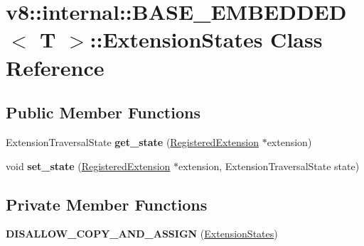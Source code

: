 \hypertarget{classv8_1_1internal_1_1_b_a_s_e___e_m_b_e_d_d_e_d_1_1_extension_states}{}\section{v8\+:\+:internal\+:\+:B\+A\+S\+E\+\_\+\+E\+M\+B\+E\+D\+D\+ED$<$ T $>$\+:\+:Extension\+States Class Reference}
\label{classv8_1_1internal_1_1_b_a_s_e___e_m_b_e_d_d_e_d_1_1_extension_states}
\subsection*{Public Member Functions}
\begin{DoxyCompactItemize}
\item 
Extension\+Traversal\+State {\bfseries get\+\_\+state} (\hyperlink{classv8_1_1_registered_extension}{Registered\+Extension} $\ast$extension)\hypertarget{classv8_1_1internal_1_1_b_a_s_e___e_m_b_e_d_d_e_d_1_1_extension_states_a9bc656598f50dcb0853caf69ae31326e}{}\label{classv8_1_1internal_1_1_b_a_s_e___e_m_b_e_d_d_e_d_1_1_extension_states_a9bc656598f50dcb0853caf69ae31326e}

\item 
void {\bfseries set\+\_\+state} (\hyperlink{classv8_1_1_registered_extension}{Registered\+Extension} $\ast$extension, Extension\+Traversal\+State state)\hypertarget{classv8_1_1internal_1_1_b_a_s_e___e_m_b_e_d_d_e_d_1_1_extension_states_ac57f42a19a9bd47ac076b16ec19e7c59}{}\label{classv8_1_1internal_1_1_b_a_s_e___e_m_b_e_d_d_e_d_1_1_extension_states_ac57f42a19a9bd47ac076b16ec19e7c59}

\end{DoxyCompactItemize}
\subsection*{Private Member Functions}
\begin{DoxyCompactItemize}
\item 
{\bfseries D\+I\+S\+A\+L\+L\+O\+W\+\_\+\+C\+O\+P\+Y\+\_\+\+A\+N\+D\+\_\+\+A\+S\+S\+I\+GN} (\hyperlink{classv8_1_1internal_1_1_b_a_s_e___e_m_b_e_d_d_e_d_1_1_extension_states}{Extension\+States})\hypertarget{classv8_1_1internal_1_1_b_a_s_e___e_m_b_e_d_d_e_d_1_1_extension_states_a9dd4c96efa2b8148816126bbfeeea511}{}\label{classv8_1_1internal_1_1_b_a_s_e___e_m_b_e_d_d_e_d_1_1_extension_states_a9dd4c96efa2b8148816126bbfeeea511}

\end{DoxyCompactItemize}
